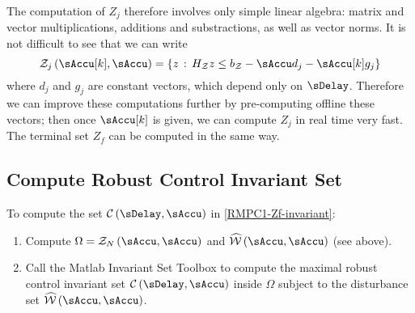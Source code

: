 The computation of $Z_{j}$ therefore involves only simple linear
algebra: matrix and vector multiplications, additions and substractions,
as well as vector norms. It is not difficult to see that we can write
\begin{equation}
\ZSet_{j}\left(\sAccu[k],\sAccu\right)=\left\{ z\SuchThat H_{\ZSet}z\leq b_{\ZSet}-\sAccu d_{j}-\sAccu[k]g_{j}\right\} \label{eq:impl-Zj-linear}
\end{equation}
where $d_{j}$ and $g_{j}$ are constant vectors, %
which depend only on $\sDelay$. %
Therefore we can improve %
these computations further by pre-computing offline
these vectors; then once $\sAccu[k]$ is given, we can compute $Z_{j}$
in real time very fast.
%
The terminal set $Z_{f}$ can be computed in the same way.


\subsection{Compute Robust Control Invariant Set}

To compute the set $\CCC\left(\sDelay,\sAccu\right)$ in \eqref{RMPC1-Zf-invariant}:
\begin{enumerate}
\item Compute $\Omega=\ZSet_{N}\left(\sAccu,\sAccu\right)$ and
$\WhSet\left(\sAccu,\sAccu\right)$ (see above).
\item Call the Matlab Invariant Set Toolbox \cite{invset} to compute the maximal robust
control invariant set $\CCC\left(\sDelay,\sAccu\right)$ inside $\Omega$ subject to the disturbance
set $\WhSet\left(\sAccu,\sAccu\right)$. 
\end{enumerate}


